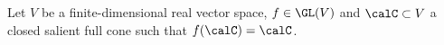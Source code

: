 Let \(V\) be a finite-dimensional real vector space, \(f \in \GL(V)\) and \(\calC \subset V\) a closed salient full cone such that \(f(\calC) = \calC\).

